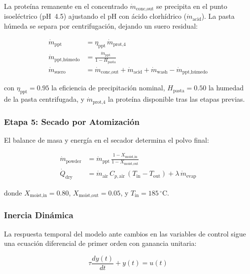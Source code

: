 \documentclass[10pt,letterpaper,twocolumn]{article}
\begin{document}
La prote\'ina remanente en el concentrado $\dot{m}_{\text{conc,out}}$ se precipita en el punto isoel\'ectrico (pH~4.5) ajustando el pH con \'acido clorh\'idrico ($\dot{m}_{\text{acid}}$). La pasta h\'umeda se separa por centrifugaci\'on, dejando un suero residual:

\begin{align}
\dot{m}_{\text{ppt}} &= \eta_{\text{ppt}} \, \dot{m}_{\text{prot,4}} \label{eq:stage4_ppt} \\
\dot{m}_{\text{ppt,h\'umedo}} &= \frac{\dot{m}_{\text{ppt}}}{1 - H_{\text{pasta}}} \label{eq:stage4_paste} \\
\dot{m}_{\text{suero}} &= \dot{m}_{\text{conc,out}} + \dot{m}_{\text{acid}} + \dot{m}_{\text{wash}} - \dot{m}_{\text{ppt,h\'umedo}} \label{eq:stage4_whey}
\end{align}

con $\eta_{\text{ppt}} = 0.95$ la eficiencia de precipitaci\'on nominal, $H_{\text{pasta}} = 0.50$ la humedad de la pasta centrifugada, y $\dot{m}_{\text{prot,4}}$ la prote\'ina disponible tras las etapas previas.

\subsubsection{Etapa 5: Secado por Atomizaci\'on}

El balance de masa y energ\'ia en el secador determina el polvo final:

\begin{align}
\dot{m}_{\text{powder}} &= \dot{m}_{\text{ppt}} \, \frac{1 - X_{\text{moist,in}}}{1 - X_{\text{moist,out}}} \label{eq:stage5_mass} \\
\dot{Q}_{\text{dry}} &= \dot{m}_{\text{air}} \, C_{p,\text{air}} \, (T_{\text{in}} - T_{\text{out}}) + \lambda \, \dot{m}_{\text{evap}} \label{eq:stage5_energy}
\end{align}

donde $X_{\text{moist,in}} = 0.80$, $X_{\text{moist,out}} = 0.05$, y $T_{\text{in}} = 185\,^\circ\text{C}$.

\subsubsection{Inercia Din\'amica}

La respuesta temporal del modelo ante cambios en las variables de control sigue una ecuaci\'on diferencial de primer orden con ganancia unitaria:

\begin{equation}
\tau \frac{dy(t)}{dt} + y(t) = u(t) \label{eq:inertia_ode}
\end{equation}
\end{document}
